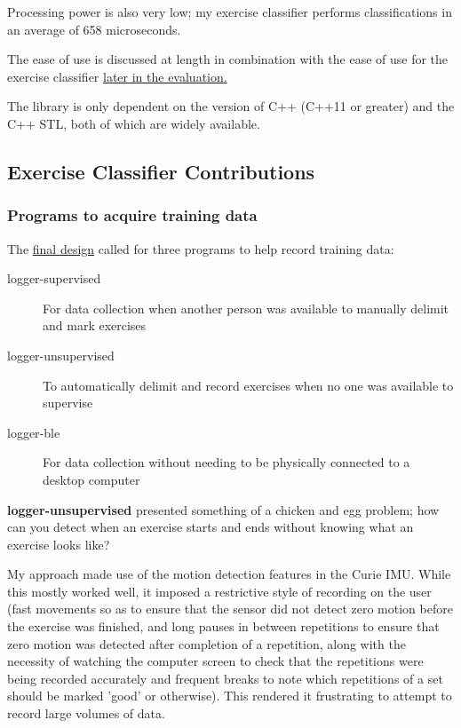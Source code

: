 \documentclass[a4paper]{article}
\begin{document}
Processing power is also very low; my exercise classifier performs classifications in an average of 658 microseconds\cite{dsref0}. 

The ease of use is discussed at length in combination with the ease of use for the exercise classifier \hyperref[subsec:ev_eu]{later in the evaluation.}

The library is only dependent on the version of C++ (C++11 or greater) and the C++ STL, both of which are widely available. 

\subsection{Exercise Classifier Contributions}%
\label{subsec:ev_cl}

\subsubsection{Programs to acquire training data}
\label{subsubsec:ev_cl_training}

The \hyperref[subsec:dc_msa]{final design} called for three programs to help record training data:

\begin{description}
\item[logger-supervised] For data collection when another person was available to manually delimit and mark exercises
\item[logger-unsupervised] To automatically delimit and record exercises when no one was available to supervise
\item[logger-ble] For data collection without needing to be physically connected to a desktop computer
\end{description}

\label{para:ev_cl_loggerunsupervised}
\textbf{logger-unsupervised} presented something of a chicken and egg problem; how can you detect when an exercise starts and ends without knowing what an exercise looks like?

My approach made use of the motion detection features in the Curie IMU. 
While this mostly worked well, it imposed a restrictive style of recording on the user (fast movements so as to ensure that the sensor did not detect zero motion before the exercise was finished, and long pauses in between repetitions to ensure that zero motion was detected after completion of a repetition, along with the necessity of watching the computer screen to check that the repetitions were being recorded accurately and frequent breaks to note which repetitions of a set should be marked 'good' or otherwise). This rendered it frustrating to attempt to record large volumes of data.
\end{document}
